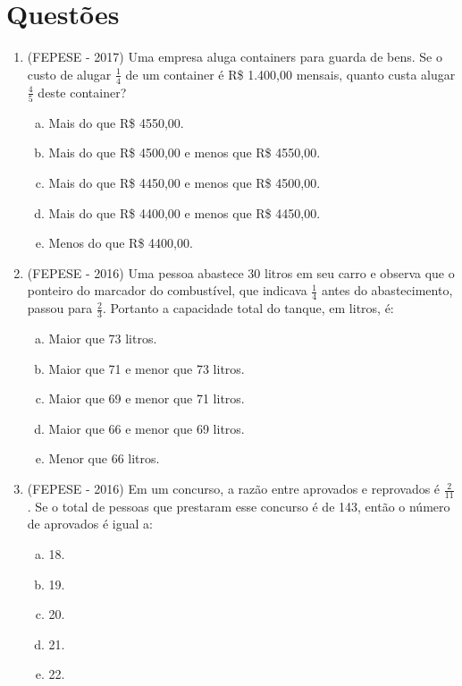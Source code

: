 \section{Questões}

 \begin{enumerate}
  \item (FEPESE - 2017) Uma empresa aluga containers para guarda de bens. Se o custo de alugar $\frac{1}{4}$ de um container é R\$ 1.400,00 mensais, quanto custa alugar $\frac{4}{5}$ deste container?
  \begin{enumerate}[a)]
  \item Mais do que R\$ 4550,00.
  \item Mais do que R\$ 4500,00 e menos que R\$ 4550,00.
  \item Mais do que R\$ 4450,00 e menos que R\$ 4500,00.
  \item Mais do que R\$ 4400,00 e menos que R\$ 4450,00.
  \item Menos do que R\$ 4400,00.
  \end{enumerate}

  \item (FEPESE - 2016) Uma pessoa abastece 30 litros em seu carro e observa que o ponteiro do marcador do combustível, que indicava $\frac{1}{4}$ antes do abastecimento, passou para $\frac{2}{3}$. Portanto a capacidade total do tanque, em litros, é:
  \begin{enumerate}[a)]
  \item Maior que 73 litros.
  \item Maior que 71 e menor que 73 litros.
  \item Maior que 69 e menor que 71 litros.
  \item Maior que 66 e menor que 69 litros.
  \item Menor que 66 litros.
  \end{enumerate}

  \item (FEPESE - 2016) Em um concurso, a razão entre aprovados e reprovados é $\frac{2}{11}$. Se o total de pessoas que prestaram esse concurso é de 143, então o número de aprovados é igual a:
  \begin{enumerate}[a)]
  \item 18.
  \item 19.
  \item 20.
  \item 21.
  \item 22.
  \end{enumerate}


\end{enumerate}
